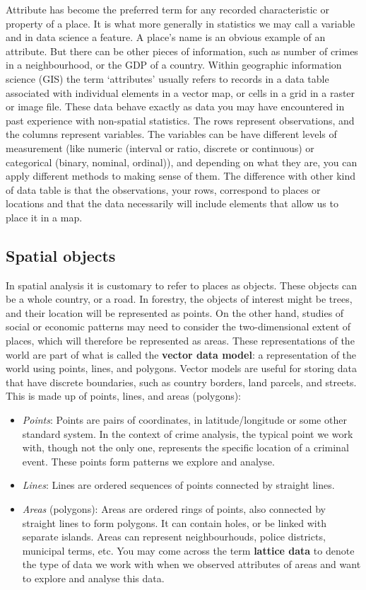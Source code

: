 \documentclass[
  krantz2]{krantz}
\providecommand{\tightlist}{%
  \setlength{\itemsep}{0pt}\setlength{\parskip}{0pt}}
\begin{document}
Attribute has become the preferred term for any recorded characteristic or property of a place. It is what more generally in statistics we may call a variable and in data science a feature. A place's name is an obvious example of an attribute. But there can be other pieces of information, such as number of crimes in a neighbourhood, or the GDP of a country. Within geographic information science (GIS) the term `attributes' usually refers to records in a data table associated with individual elements in a vector map, or cells in a grid in a raster or image file. These data behave exactly as data you may have encountered in past experience with non-spatial statistics. The rows represent observations, and the columns represent variables. The variables can be have different levels of measurement (like numeric (interval or ratio, discrete or continuous) or categorical (binary, nominal, ordinal)), and depending on what they are, you can apply different methods to making sense of them. The difference with other kind of data table is that the observations, your rows, correspond to places or locations and that the data necessarily will include elements that allow us to place it in a map.

\hypertarget{spatial-objects}{%
\subsection{Spatial objects}\label{spatial-objects}}

In spatial analysis it is customary to refer to places as objects. These objects can be a whole country, or a road. In forestry, the objects of interest might be trees, and their location will be represented as points. On the other hand, studies of social or economic patterns may need to consider the two-dimensional extent of places, which will therefore be represented as areas. These representations of the world are part of what is called the \textbf{vector data model}: a representation of the world using points, lines, and polygons. Vector models are useful for storing data that have discrete boundaries, such as country borders, land parcels, and streets. This is made up of points, lines, and areas (polygons):

\begin{itemize}
\tightlist
\item
  \emph{Points}: Points are pairs of coordinates, in latitude/longitude or some other standard system. In the context of crime analysis, the typical point we work with, though not the only one, represents the specific location of a criminal event. These points form patterns we explore and analyse.
\item
  \emph{Lines}: Lines are ordered sequences of points connected by straight lines.
\item
  \emph{Areas} (polygons): Areas are ordered rings of points, also connected by straight lines to form polygons. It can contain holes, or be linked with separate islands. Areas can represent neighbourhouds, police districts, municipal terms, etc. You may come across the term \textbf{lattice data} to denote the type of data we work with when we observed attributes of areas and want to explore and analyse this data.
\end{itemize}
\end{document}
